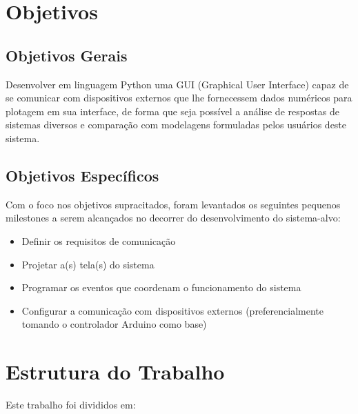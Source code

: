 \section{Objetivos}

\subsection{Objetivos Gerais}

Desenvolver em linguagem Python uma GUI (Graphical User Interface) capaz de se comunicar com dispositivos externos que lhe fornecessem dados numéricos para plotagem em sua interface, de forma que seja possível a análise de respostas de sistemas diversos e comparação com modelagens formuladas pelos usuários deste sistema.

\subsection{Objetivos Específicos}

Com o foco nos objetivos supracitados, foram levantados os seguintes pequenos milestones a serem alcançados no decorrer do desenvolvimento do sistema-alvo:

\begin{itemize}
	\item Definir os requisitos de comunicação
	\item Projetar a(s) tela(s) do sistema
	\item Programar os eventos que coordenam o funcionamento do sistema
	\item Configurar a comunicação com dispositivos externos (preferencialmente tomando o controlador Arduino como base)
\end{itemize}

\section{Estrutura do Trabalho}

Este trabalho foi divididos em:

